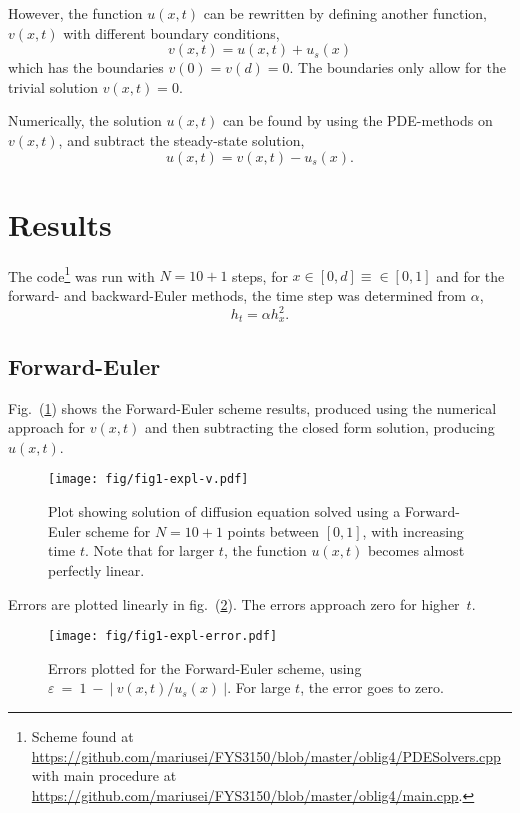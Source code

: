 \documentclass[a4paper,11pt]{article}
\begin{document}
However, the function $u(x,t)$ can be rewritten by defining another function, $v(x,t)$ with different boundary conditions,
\begin{equation}
    v(x,t) = u(x,t) + u_s(x)
    \label{eq:v}
\end{equation}
which has the boundaries $v(0) = v(d) = 0$. The boundaries only allow for the trivial solution $v(x,t) = 0$. 

Numerically, the solution $u(x,t)$ can be found by using the PDE-methods on $v(x,t)$, and subtract the steady-state solution,
\[ u(x,t) = v(x,t)- u_s(x). \]

\section{Results}
The code\footnote{Scheme found at \url{https://github.com/mariusei/FYS3150/blob/master/oblig4/PDESolvers.cpp} with main procedure at \url{https://github.com/mariusei/FYS3150/blob/master/oblig4/main.cpp}.} was run with $N=10+1$ steps, for $x\in[0,d] \equiv \in [0,1]$ and for the forward- and backward-Euler methods, the time step was determined from $\alpha$, 
\[ h_t = \alpha h_x^2. \]

\subsection{Forward-Euler}
Fig.~(\ref{fig:1}) shows the Forward-Euler scheme results, produced using the numerical approach for $v(x,t)$ and then subtracting the closed form solution, producing $u(x,t)$.

\begin{figure}[htb]
    \centering
    \texttt{[image: fig/fig1-expl-v.pdf]}
    \caption{Plot showing solution of diffusion equation solved using a Forward-Euler scheme for $N=10+1$ points between $[0,1]$, with increasing time $t$. Note that for larger $t$, the function $u(x,t)$ becomes almost perfectly linear.}
    \label{fig:1}
\end{figure}

Errors are plotted linearly in fig.~(\ref{fig:1e}). The errors approach zero for higher~$t$.

\begin{figure}[htpb]
    \centering
    \texttt{[image: fig/fig1-expl-error.pdf]}
\caption{Errors plotted for the Forward-Euler scheme, using $\varepsilon~=~1~-~|~v(x,t)/u_s(x)~| $. For large $t$, the error goes to zero. }
    \label{fig:1e}
\end{figure}
\end{document}

